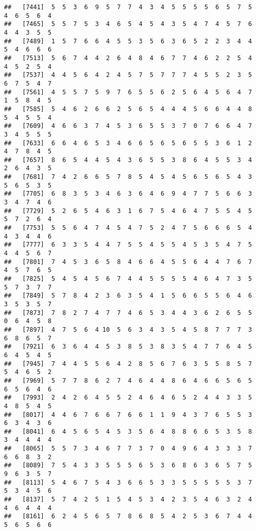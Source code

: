 \documentclass[
]{book}
\begin{document}
\begin{verbatim}
##   [7441]  5  5  3  6  9  5  7  7  4  3  4  5  5  5  5  6  5  7  5  4  6  5  6  4
##   [7465]  5  5  7  5  3  4  6  5  4  5  4  3  5  4  7  4  5  7  6  4  4  3  5  5
##   [7489]  1  5  7  6  6  4  5  5  3  5  6  3  6  5  2  2  3  4  4  5  4  6  6  6
##   [7513]  5  6  7  4  4  2  6  4  8  4  6  7  7  4  6  2  2  5  4  4  5  2  5  4
##   [7537]  4  4  5  6  4  2  4  5  7  5  7  7  7  4  5  5  2  3  5  6  7  5  4  7
##   [7561]  4  5  5  7  5  9  7  6  5  5  6  2  5  6  4  5  6  4  7  1  5  8  4  5
##   [7585]  5  4  6  2  6  6  2  5  6  5  4  4  4  5  6  6  4  4  8  5  4  5  5  4
##   [7609]  4  6  6  3  7  4  5  3  6  5  5  3  7  0  7  6  6  4  7  3  4  5  5  5
##   [7633]  6  6  4  6  5  3  4  6  6  5  6  5  6  5  5  3  6  1  2  4  7  8  4  5
##   [7657]  8  6  5  4  4  5  4  3  6  5  5  3  8  6  4  5  5  3  4  2  6  4  3  5
##   [7681]  7  4  2  6  6  5  7  8  5  4  5  4  5  6  5  6  5  4  3  5  6  5  3  5
##   [7705]  6  8  3  5  3  4  6  3  6  4  6  9  4  7  7  5  6  6  3  3  4  7  4  6
##   [7729]  5  2  6  5  4  6  3  1  6  7  5  4  6  4  7  5  5  4  5  5  7  2  6  4
##   [7753]  5  5  6  4  7  4  5  4  7  5  2  4  7  5  6  6  6  5  4  4  3  4  4  6
##   [7777]  6  3  3  5  4  4  7  5  5  4  5  5  4  5  3  5  4  7  5  4  4  5  6  7
##   [7801]  7  4  5  3  6  5  8  4  6  6  4  5  5  6  4  4  7  6  7  4  5  7  6  5
##   [7825]  5  4  5  4  5  6  7  4  4  5  5  5  5  4  6  4  7  3  5  5  7  3  7  7
##   [7849]  5  7  8  4  2  3  6  3  5  4  1  5  6  6  5  5  6  4  6  3  5  3  5  7
##   [7873]  7  8  2  7  4  7  7  4  6  5  3  4  4  3  6  2  6  5  5  0  6  4  5  8
##   [7897]  4  7  5  6  4 10  5  6  3  4  3  5  4  5  8  7  7  7  3  6  8  6  5  7
##   [7921]  6  3  6  4  4  5  3  8  5  3  8  3  5  4  7  7  6  4  5  6  4  5  4  5
##   [7945]  7  4  4  5  5  6  4  2  8  5  6  7  6  3  5  5  8  5  7  5  4  6  5  2
##   [7969]  5  7  7  8  6  2  7  4  6  4  4  8  6  4  6  6  5  6  5  6  5  6  4  6
##   [7993]  2  4  2  6  4  5  5  2  4  6  4  6  5  2  4  4  3  3  5  4  8  5  4  5
##   [8017]  4  4  6  7  6  6  7  6  6  1  1  9  4  3  7  6  5  5  3  6  3  4  3  6
##   [8041]  6  4  5  6  5  4  5  3  5  6  4  8  8  6  6  5  3  5  8  3  4  4  4  4
##   [8065]  5  5  7  3  4  6  7  7  3  7  0  4  9  6  4  3  3  3  7  6  6  8  3  2
##   [8089]  7  5  4  3  3  5  5  5  6  5  3  6  8  6  3  6  5  7  5  9  6  3  5  7
##   [8113]  5  4  6  7  5  4  3  6  6  5  3  3  5  5  5  5  5  3  7  5  3  4  5  6
##   [8137]  5  7  4  2  5  1  5  4  5  3  4  2  3  5  4  6  3  2  4  4  6  4  4  4
##   [8161]  6  2  4  5  6  5  7  8  6  8  5  4  2  5  3  6  7  4  4  5  6  5  6  6

\end{verbatim}
\end{document}
